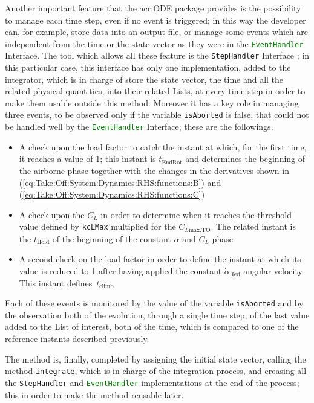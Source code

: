 \bigskip
\noindent
Another important feature that the \gls{acr:ODE} package provides is the possibility to manage each time step, even if no event is triggered; in this way the developer can, for example, store data into an output file, or manage some events which are independent from the time or the state vector as they were in the \lstinline[language=Java]!EventHandler! \gls{Interface}. The tool which allows all these feature is the \lstinline[language=Java]!StepHandler! \gls{Interface} \cite{apache:ode}; in this particular case, this interface has only one implementation, added to the integrator, which is in charge of store the state vector, the time and all the related physical quantities, into their related \gls{List}s, at every time step in order to make them usable outside this method. Moreover it has a key role in managing three events, to be observed only if the variable \lstinline[language=Java]!isAborted! is false, that could not be handled well by the \lstinline[language=Java]!EventHandler! \gls{Interface}; these are the followings.
%
\begin{itemize}
\item A check upon the load factor to catch the instant at which, for the first time, it reaches a value of 1; this instant is $t_{\text{EndRot}}$ and determines the beginning of the airborne phase together with the changes in the derivatives shown in (\ref{eq:Take:Off:System:Dynamics:RHS:functions:B}) and (\ref{eq:Take:Off:System:Dynamics:RHS:functions:C})
\item A check upon the $C_L$ in order to determine when it reaches the threshold value defined by \lstinline[language=Java]!kcLMax! multiplied for the $C_{L\text{max,TO}}$. The related instant is the $t_{\text{Hold}}$ of the beginning of the constant $\alpha$ and $C_L$ phase
\item A second check on the load factor in order to define the instant at which its value is reduced to 1 after having applied the constant $\dot\alpha_{\text{Red}}$ angular velocity. This instant defines~$t_{\text{climb}}$ 
\end{itemize}
%
Each of these events is monitored by the value of the variable \lstinline[language=Java]!isAborted! and by the observation both of the evolution, through a single time step, of the last value added to the \gls{List} of interest, both of the time, which is compared to one of the reference instants described previously.

\bigskip
\noindent
The method is, finally, completed by assigning the initial state vector, calling the method \lstinline[language=Java]!integrate!, which is in charge of the integration process, and ereasing all the \lstinline[language=Java]!StepHandler! and \lstinline[language=Java]!EventHandler! implementations at the end of the process; this in order to make the method reusable later.

